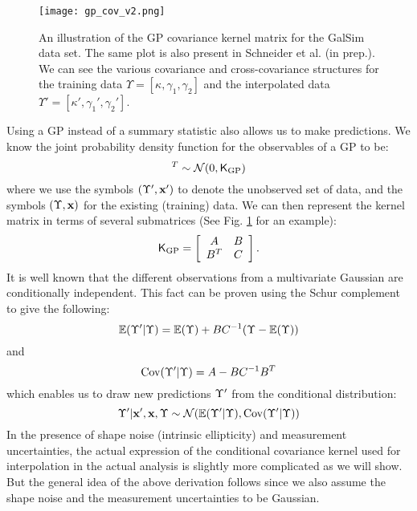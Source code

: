 \begin{figure}
	\centering
	\texttt{[image: gp\_cov\_v2.png]}
	\caption{An illustration of the GP covariance kernel matrix for the {\sc GalSim} data set.
		The same plot is also present in Schneider et al. (in prep.). We can see the various covariance
		and cross-covariance
		structures for the training data $\Upsilon = [\kappa, \gamma_1, \gamma_2]$
		and the interpolated data $\Upsilon' = [\kappa', \gamma_1', \gamma_2']$.
		\label{fig:GP_kernel_vis}}
\end{figure}
Using a GP instead of a summary statistic also allows us to make predictions. 
We know the joint probability density function for the observables of a GP to
be:
\begin{equation}
	[\lensparams',\lensparams]^T \sim \mathcal{N}(0, \kerngp_{\rm GP})
\end{equation}
where we use the symbols $(\Upsilon', \mathbf{x}')$ to denote the unobserved set of data,
and the symbols $(\Upsilon, \mathbf{x})$ for the existing (training) data.
We can then represent the kernel matrix in terms of several submatrices 
(See Fig. \ref{fig:GP_kernel_vis} for an example):
\begin{equation}
	\mathsf{K}_{\rm GP} = \left[\begin{array}{cc}
	A & B \\
	B^T & C 
\end{array} \right].	
\end{equation}
It is well known that the different observations from a multivariate Gaussian are 
conditionally independent. This fact can be proven using the Schur complement to give the following:
\begin{equation}
	\mathbb{E}(\Upsilon'|\Upsilon) = \mathbb{E}(\Upsilon) + BC^{-1}(\Upsilon - \mathbb{E}(\Upsilon))
\end{equation}
and
\begin{equation}
	\mathrm{Cov}(\Upsilon'|\Upsilon) = A - BC^{-1}B^T
\end{equation}
which enables us to draw new predictions $\Upsilon'$ from the conditional distribution:
\begin{equation} 
	\Upsilon' | \mathbf{x}', \mathbf{x}, \Upsilon \sim \mathcal{N}(
		\mathbb{E}(\Upsilon'| \Upsilon), \mathrm{Cov}(\Upsilon'|\Upsilon)
	)
\end{equation}
In the presence of shape noise (intrinsic ellipticity) and measurement uncertainties, the actual 
expression of the conditional covariance kernel used for interpolation in the actual analysis 
is slightly more complicated as we will show. 
But the general idea of the above derivation follows 
since we also assume the shape noise and the measurement uncertainties to be Gaussian.

